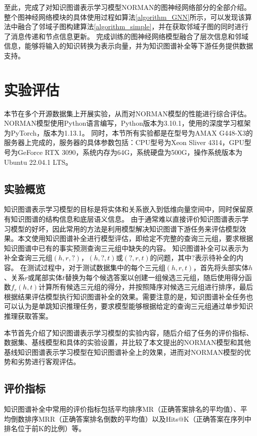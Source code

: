 \documentclass[algorithmlist, AutoFakeBold, AutoFakeSlant, figurelist, tablelist, nomlist, engineering, openany]{seuthesix} %
\begin{document}
至此，完成了对知识图谱表示学习模型NORMAN的图神经网络部分的全部介绍。
整个图神经网络模块的具体使用过程如算法\ref{algorithm_GNN}所示，可以发现该算法中融合了邻域子图构建算法\ref{algorithm_simple}，并在获取邻域子图的同时进行了消息传递和节点信息更新。
完成训练的图神经网络模型融合了层次信息和邻域信息，能够将输入的知识转换为表示向量，并为知识图谱补全等下游任务提供数据支持。


\section{实验评估}
本节在多个开源数据集上开展实验，从而对NORMAN模型的性能进行综合评估。
NORMAN模型使用Python语言编写，Python版本为3.10.1，使用的深度学习框架为PyTorch，版本为1.13.1。
同时，本节所有实验都是在型号为AMAX G448-X3的服务器上完成的，服务器的具体参数包括：CPU型号为Xeon Sliver 4314，GPU型号为GeForce RTX 3090，系统内存为64G，系统硬盘为500G，操作系统版本为Ubuntu 22.04.1 LTS。

\subsection{实验概览}
知识图谱表示学习模型的目标是将实体和关系嵌入到低维向量空间中，同时保留原有知识图谱的结构信息和底层语义信息。
由于通常难以直接评价知识图谱表示学习模型的好坏，因此常用的方法是利用模型解决知识图谱下游任务来评估模型效果。本文使用知识图谱补全进行模型评估，即给定不完整的查询三元组，要求根据知识图谱中已有的事实预测查询三元组中缺失的内容。
知识图谱补全可以表示为补全查询三元组$\left(h, r, ?\right)$，$(h, ?, t)$或$\left(?, r, t\right)$的问题，其中$?$表示待补全的内容。
在测试过程中，对于测试数据集中的每个三元组$(h, r, t)$，首先将头部实体$h$、关系$r$或尾部实体$t$替换为每个候选答案以创建一组候选三元组，随后使用得分函数$f_r\left(h, t\right)$计算所有候选三元组的得分，并按照降序对候选三元组进行排序，最后根据结果评估模型执行知识图谱补全的效果。需要注意的是，知识图谱补全任务也可以认为是单跳知识推理任务，要求模型能够根据给定的查询三元组通过单步知识推理获取答案。

本节首先介绍了知识图谱表示学习模型的实验内容，随后介绍了任务的评价指标、数据集、基线模型和具体的实验设置，并比较了本文提出的NORMAN模型和其他基线知识图谱表示学习模型在知识图谱补全上的效果，进而对NORMAN模型的优势和劣势进行客观评估。

\subsection{评价指标}
知识图谱补全中常用的评价指标包括平均排序MR（正确答案排名的平均值）、平均倒数排序MRR（正确答案排名倒数的平均值）以及Hits@K（正确答案在序列中排名位于前K的比例）等。
\end{document}
